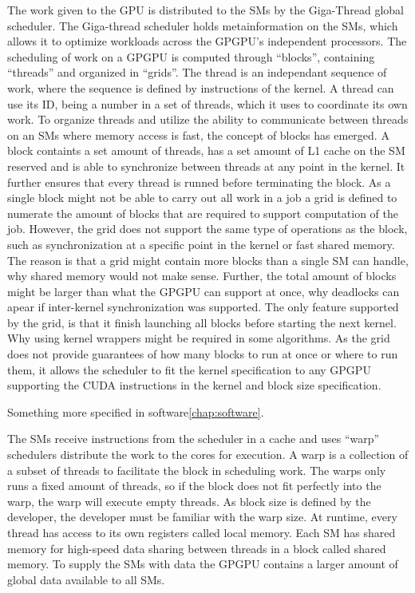 The work given to the GPU is distributed to the SMs by the Giga-Thread global scheduler.
The Giga-thread scheduler holds metainformation on the SMs, which allows it to optimize workloads across the GPGPU's independent processors.
The scheduling of work on a GPGPU is computed through ``blocks'', containing ``threads'' and organized in ``grids''.
The thread is an independant sequence of work, where the sequence is defined by instructions of the kernel.
A thread can use its ID, being a number in a set of threads, which it uses to coordinate its own work.
To organize threads and utilize the ability to communicate between threads on an SMs where memory access is fast, the concept of blocks has emerged.
A block containts a set amount of threads, has a set amount of L1 cache on the SM reserved and is able to synchronize between threads at any point in the kernel.
It further ensures that every thread is runned before terminating the block.
As a single block might not be able to carry out all work in a job a grid is defined to numerate the amount of blocks that are required to support computation of the job.
However, the grid does not support the same type of operations as the block, such as synchronization at a specific point in the kernel or fast shared memory.
The reason is that a grid might contain more blocks than a single SM can handle, why shared memory would not make sense.
Further, the total amount of blocks might be larger than what the GPGPU can support at once, why deadlocks can apear if inter-kernel synchronization was supported.
The only feature supported by the grid, is that it finish launching all blocks before starting the next kernel.
Why using kernel wrappers might be required in some algorithms.
As the grid does not provide guarantees of how many blocks to run at once or where to run them, it allows the scheduler to fit the kernel specification to any GPGPU supporting the CUDA instructions in the kernel and block size specification.

Something more specified in software\cref{chap:software}.

The SMs receive instructions from the scheduler in a cache and uses ``warp'' schedulers distribute the work to the cores for execution.
A warp is a collection of a subset of threads to facilitate the block in scheduling work.
The warps only runs a fixed amount of threads, so if the block does not fit perfectly into the warp, the warp will execute empty threads.
As block size is defined by the developer, the developer must be familiar with the warp size.
At runtime, every thread has access to its own registers called local memory.
Each SM has shared memory for high-speed data sharing between threads in a block called shared memory.
To supply the SMs with data the GPGPU contains a larger amount of global data available to all SMs.

